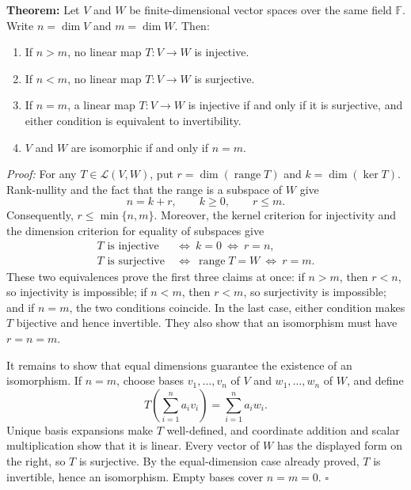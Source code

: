 \documentclass[a4paper,11pt,abstract=true]{scrartcl}
\theoremstyle{dotlessP}
\theoremstyle{dotlessS}
\theoremstyle{remark}
\theoremstyle{definition}
\begin{document}
%
\label{thm:dimension-criteria}%
\begin{problem_box}
\textbf{Theorem:}
Let $V$ and
$W$ be finite-dimensional vector spaces over the same field $\mathbb{F}$.
Write $n=\dim V$ and $m=\dim W$. Then:
\begin{enumerate}
    \item If $n>m$, no linear map $T:V\longrightarrow W$ is injective.
    \item If $n<m$, no linear map $T:V\longrightarrow W$ is surjective.
    \item If $n=m$, a linear map $T:V\longrightarrow W$ is injective
    if and only if it is surjective, and either condition is equivalent
    to invertibility.
    \item $V$ and $W$ are isomorphic if and only if $n=m$.
\end{enumerate}
\end{problem_box}

\begin{claim_box}

\textit{Proof:} For any $T\in\mathcal{L}(V,W)$, put
$r=\dim(\operatorname{range}T)$ and $k=\dim(\ker T)$.
Rank-nullity and the fact that the range is a subspace of $W$ give
\[
n=k+r,\qquad k\geq0,\qquad r\leq m.
\]
Consequently, $r\leq\min\{n,m\}$. Moreover, the kernel criterion for
injectivity and the dimension criterion for equality of subspaces give
\[
\begin{aligned}
T\text{ is injective}&\ \Longleftrightarrow\ k=0
\ \Longleftrightarrow\ r=n,\\
T\text{ is surjective}&\ \Longleftrightarrow\
\operatorname{range}T=W\ \Longleftrightarrow\ r=m.
\end{aligned}
\]
These two equivalences prove the first three claims at once: if $n>m$,
then $r<n$, so injectivity is impossible; if $n<m$, then $r<m$, so
surjectivity is impossible; and if $n=m$, the two conditions coincide.
In the last case, either condition makes $T$ bijective and hence
invertible. They also show that an isomorphism must have $r=n=m$.

It remains to show that equal dimensions guarantee the existence of
an isomorphism. If $n=m$, choose bases $v_1,\ldots,v_n$ of $V$ and
$w_1,\ldots,w_n$ of $W$, and define
\[
T\left(\sum_{i=1}^n a_i v_i\right)=\sum_{i=1}^n a_i w_i.
\]
Unique basis expansions make $T$ well-defined, and coordinate addition
and scalar multiplication show that it is linear. Every vector of $W$
has the displayed form on the right, so $T$ is surjective. By the
equal-dimension case already proved, $T$ is invertible, hence an
isomorphism. Empty bases cover $n=m=0$. \hfill$\square$
\end{claim_box}
\end{document}
